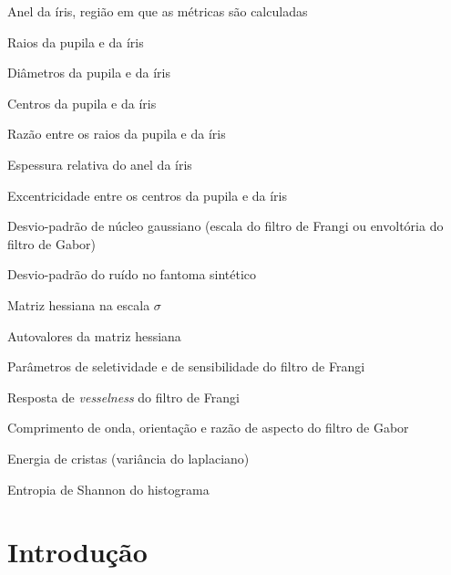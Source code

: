 \documentclass[12pt, oneside, a4paper, chapter=TITLE, section=TITLE,
               english, brazil]{abntex2}
\newcommand{\ves}{\emph{vesselness}}
\begin{document}
\begin{simbolos}
  \item[$\Omega$] Anel da íris, região em que as métricas são calculadas
  \item[$r_p$, $r_i$] Raios da pupila e da íris
  \item[$D_p$, $D_i$] Diâmetros da pupila e da íris
  \item[$\mathbf{c}_p$, $\mathbf{c}_i$] Centros da pupila e da íris
  \item[$\rho$] Razão entre os raios da pupila e da íris
  \item[$\tau$] Espessura relativa do anel da íris
  \item[$\epsilon$] Excentricidade entre os centros da pupila e da íris
  \item[$\sigma$] Desvio-padrão de núcleo gaussiano (escala do filtro de
    Frangi ou envoltória do filtro de Gabor)
  \item[$\sigma_n$] Desvio-padrão do ruído no fantoma sintético
  \item[$H_\sigma$] Matriz hessiana na escala $\sigma$
  \item[$\lambda_1$, $\lambda_2$] Autovalores da matriz hessiana
  \item[$\beta$, $c$] Parâmetros de seletividade e de sensibilidade do filtro
    de Frangi
  \item[$V$] Resposta de \ves{} do filtro de Frangi
  \item[$\lambda$, $\theta$, $\gamma$] Comprimento de onda, orientação e razão
    de aspecto do filtro de Gabor
  \item[$E$] Energia de cristas (variância do laplaciano)
  \item[$H$] Entropia de Shannon do histograma
\end{simbolos}

\tableofcontents*
\cleardoublepage

\textual
\pagestyle{abntsimples}

\chapter{Introdução}
\label{cap:intro}
\end{document}
